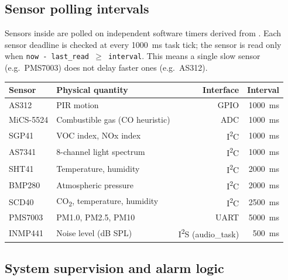 \documentclass[11pt,a4paper]{article}
\newcommand{\rowhdr}{\rowcolor{tablehdr}}
\begin{document}
\subsection{Sensor polling intervals}

Sensors inside \texttt{} are polled on independent software timers derived from
\texttt{}. Each sensor deadline is checked at every 1000~ms task tick; the
sensor is read only when \texttt{now - last\_read \(\geq\) interval}. This means a single slow
sensor (e.g.\ PMS7003) does not delay faster ones (e.g.\ AS312).

\vspace{8pt}

{\footnotesize
\setlength{\tabcolsep}{4pt}
\renewcommand{\arraystretch}{1.1}

\noindent
{}
\begin{tabularx}{\textwidth}{@{}lXrr@{}}
\toprule
\rowhdr
\textbf{Sensor} & \textbf{Physical quantity} & \textbf{Interface} & \textbf{Interval} \\
\midrule
AS312  & PIR motion                         & GPIO                          & 1000~ms \\
MiCS-5524 & Combustible gas (CO heuristic)  & ADC                           & 1000~ms \\
SGP41  & VOC index, NOx index               & I\textsuperscript{2}C         & 1000~ms \\
AS7341 & 8-channel light spectrum           & I\textsuperscript{2}C         & 1000~ms \\
SHT41  & Temperature, humidity              & I\textsuperscript{2}C         & 2000~ms \\
BMP280 & Atmospheric pressure               & I\textsuperscript{2}C         & 2000~ms \\
SCD40  & CO\textsubscript{2}, temperature, humidity & I\textsuperscript{2}C  & 2500~ms \\
PMS7003 & PM1.0, PM2.5, PM10               & UART                          & 5000~ms \\
INMP441 & Noise level (dB SPL)             & I\textsuperscript{2}S (audio\_task) & 500~ms \\
\bottomrule
\end{tabularx}
}

\newpage

\subsection{System supervision and alarm logic}
\end{document}
